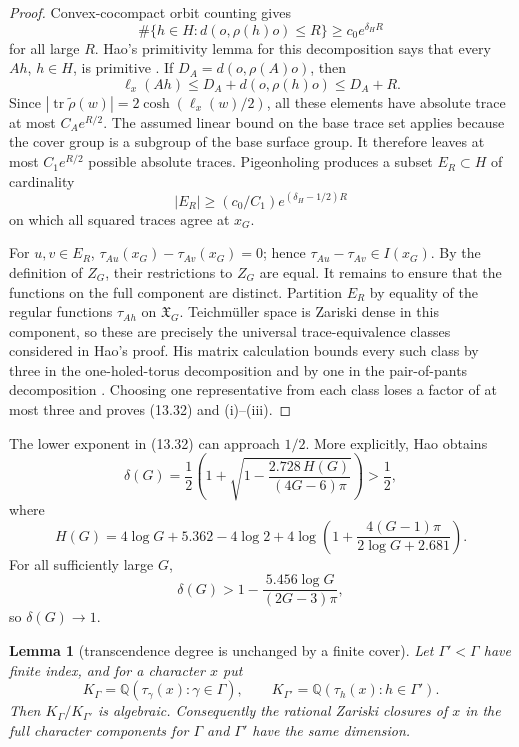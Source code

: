 \documentclass[11pt,reqno]{amsart}
\newtheorem{lemma}[theorem]{Lemma}
\theoremstyle{definition}
\theoremstyle{remark}
\newcommand{\Q}{\mathbb Q}
\newcommand{\Tr}{\operatorname{tr}}
\begin{document}
\begin{proof}
Convex-cocompact orbit counting gives
\[
 \#\{h\in H:d(o,\rho(h)o)\le R\}
   \ge c_0e^{\delta_HR}
\]
for all large \(R\).  Hao's primitivity lemma for this decomposition says
that every \(Ah\), \(h\in H\), is primitive
\cite[Lemma~4.7]{HaoLengthSets}.  If
\(D_A=d(o,\rho(A)o)\), then
\[
 \ell_x(Ah)\le D_A+d(o,\rho(h)o)\le D_A+R.
\]
Since \(|\Tr\widetilde\rho(w)|=2\cosh(\ell_x(w)/2)\), all these elements
have absolute trace at most \(C_Ae^{R/2}\).  The assumed linear bound on
the base trace set applies because the cover group is a subgroup of the
base surface group.  It therefore leaves at most \(C_1e^{R/2}\) possible
absolute traces.  Pigeonholing produces a subset \(E_R\subset H\) of
cardinality
\[
 |E_R|\ge(c_0/C_1)e^{(\delta_H-1/2)R}
\]
on which all squared traces agree at \(x_G\).

For \(u,v\in E_R\),
\(\tau_{Au}(x_G)-\tau_{Av}(x_G)=0\); hence
\(\tau_{Au}-\tau_{Av}\in I(x_G)\).  By the definition of \(Z_G\), their
restrictions to \(Z_G\) are equal.  It remains to ensure that the functions
on the full component are distinct.  Partition \(E_R\) by equality of the
regular functions \(\tau_{Ah}\) on \(\mathfrak X_G\).  Teichm\"uller space
is Zariski dense in this component, so these are precisely the universal
trace-equivalence classes considered in Hao's proof.  His matrix
calculation bounds every such class by three in the one-holed-torus
decomposition and by one in the pair-of-pants decomposition
\cite[Lemmas~4.2--4.3 and Corollary~4.6]{HaoLengthSets}.  Choosing one
representative from each class loses a factor of at most three and proves
(13.32) and (i)--(iii).
\end{proof}

The lower exponent in (13.32) can approach \(1/2\).  More explicitly, Hao
obtains
\[
 \delta(G)=\frac12\left(
 1+\sqrt{1-\frac{2.728\,H(G)}{(4G-6)\pi}}\right)>\frac12,
\]
where
\[
 H(G)=4\log G+5.362-4\log2+
 4\log\left(1+\frac{4(G-1)\pi}{2\log G+2.681}\right).
\]
For all sufficiently large \(G\),
\[
 \delta(G)>1-\frac{5.456\log G}{(2G-3)\pi},
\]
so \(\delta(G)\to1\).

\begin{lemma}[transcendence degree is unchanged by a finite cover]
\label{lem:finite-cover-trdeg}
Let \(\Gamma'<\Gamma\) have finite index, and for a character \(x\) put
\[
 K_\Gamma=\Q(\tau_\gamma(x):\gamma\in\Gamma),\qquad
 K_{\Gamma'}=\Q(\tau_h(x):h\in\Gamma').
\]
Then \(K_\Gamma/K_{\Gamma'}\) is algebraic.  Consequently the rational
Zariski closures of \(x\) in the full character components for \(\Gamma\)
and \(\Gamma'\) have the same dimension.
\end{lemma}
\end{document}

